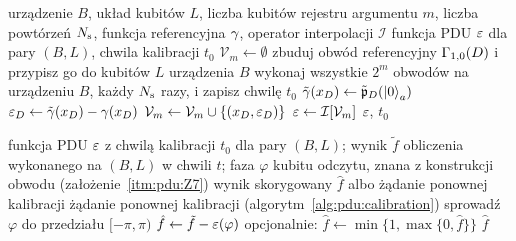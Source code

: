 \begin{algorithm}[tb]
\algrenewcommand{}
\algrenewcommand{}
\algrenewcommand{}
\algrenewcommand{}
\algrenewcommand{}
\algrenewcommand{}
\caption{Kalibracja funkcji PDU}\label{alg:pdu:calibration}
\begin{algorithmic}[1]
\Require urządzenie $B$, układ kubitów $L$, liczba kubitów rejestru argumentu $m$, liczba powtórzeń $N_{\mathrm{s}}$, funkcja referencyjna $\gamma$, operator interpolacji $\mathcal{I}$
\Ensure funkcja PDU $\varepsilon$ dla pary $(B,L)$, chwila kalibracji $t_0$
\State $\mathcal{V}_m\gets\emptyset$
  \State zbuduj obwód referencyjny $\Gamma_{1,0}(D)$ i przypisz go do kubitów $L$ urządzenia $B$
\EndFor
\State wykonaj wszystkie $2^{m}$ obwodów na urządzeniu $B$, każdy $N_{\mathrm{s}}$ razy, i zapisz chwilę $t_0$
  \State $\tilde{\gamma}(x_D)\gets\tilde{\mathfrak{p}}_D(\ket{0}_a)$ 
  \State $\varepsilon_D\gets\tilde{\gamma}(x_D)-\gamma(x_D)$ 
  \State $\mathcal{V}_m\gets\mathcal{V}_m\cup\{(x_D,\varepsilon_D)\}$
\EndFor
\State $\varepsilon\gets\mathcal{I}[\mathcal{V}_m]$
\State \Return $\varepsilon$, $t_0$
\end{algorithmic}
\end{algorithm}

\begin{algorithm}[tb]
\algrenewcommand{}
\algrenewcommand{}
\algrenewcommand{}
\algrenewcommand{}
\algrenewcommand{}
\algrenewcommand{}
\caption{Korekta wyniku obliczenia funkcją PDU}\label{alg:pdu:correction}
\begin{algorithmic}[1]
\Require funkcja PDU $\varepsilon$ z chwilą kalibracji $t_0$ dla pary $(B,L)$; wynik $\tilde{f}$ obliczenia wykonanego na $(B,L)$ w chwili $t$; faza $\varphi$ kubitu odczytu, znana z konstrukcji obwodu (założenie~\ref{itm:pdu:Z7})
\Ensure wynik skorygowany $\hat{f}$ albo żądanie ponownej kalibracji
  \State \Return żądanie ponownej kalibracji (algorytm~\ref{alg:pdu:calibration})
\EndIf
\State sprowadź $\varphi$ do przedziału $[-\pi,\pi)$
\State $\hat{f}\gets\tilde{f}-\varepsilon(\varphi)$
\State opcjonalnie: $\hat{f}\gets\min\{1,\max\{0,\hat{f}\}\}$ 
\State \Return $\hat{f}$
\end{algorithmic}
\end{algorithm}

